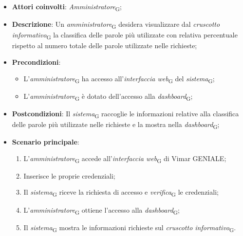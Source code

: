 \begin{itemize}
    \item \textbf{Attori coinvolti}: \textit{Amministratore}\textsubscript{G};
    \item \textbf{Descrizione}: Un \textit{amministratore}\textsubscript{G} desidera visualizzare dal \textit{cruscotto informativo}\textsubscript{G} la classifica delle parole più utilizzate con relativa percentuale rispetto al numero totale delle parole utilizzate nelle richieste;
    \item \textbf{Precondizioni}: 
        \begin{itemize}
            \item L’\textit{amministratore}\textsubscript{G} ha accesso all’\textit{interfaccia web}\textsubscript{G} del \textit{sistema}\textsubscript{G};
            \item L’\textit{amministratore}\textsubscript{G} è dotato dell’accesso alla \textit{dashboard}\textsubscript{G};
        \end{itemize}
    \item \textbf{Postcondizioni}: Il \textit{sistema}\textsubscript{G} raccoglie le informazioni relative alla classifica delle parole più utilizzate nelle richieste e la mostra nella \textit{dashboard}\textsubscript{G};
    \item \textbf{Scenario principale}:
    \begin{enumerate}
    \item L’\textit{amministratore}\textsubscript{G} accede all’\textit{interfaccia web}\textsubscript{G} di Vimar GENIALE;
    \item Inserisce le proprie credenziali;
    \item Il \textit{sistema}\textsubscript{G} riceve la richiesta di accesso e \textit{verifica}\textsubscript{G} le credenziali;
    \item L’\textit{amministratore}\textsubscript{G} ottiene l’accesso alla \textit{dashboard}\textsubscript{G};
    \item Il \textit{sistema}\textsubscript{G} mostra le informazioni richieste sul \textit{cruscotto informativo}\textsubscript{G}.
    \end{enumerate}
\end{itemize}

